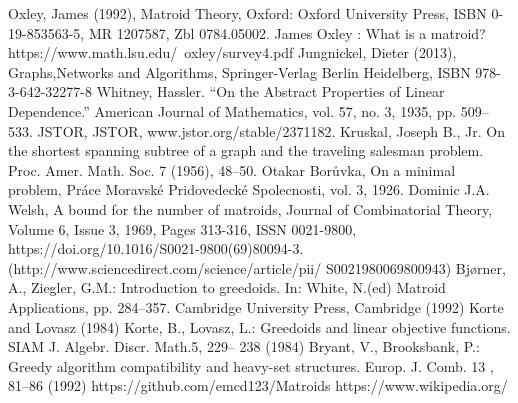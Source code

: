 \documentclass{article}
\theoremstyle{plain}
\theoremstyle{definition}
\theoremstyle{remark}
\begin{document}
\begin{thebibliography}{}
    Oxley, James (1992), Matroid Theory, Oxford: Oxford University Press, ISBN 0-19-853563-5, MR 1207587, Zbl 0784.05002.
    James Oxley : What is a matroid? https://www.math.lsu.edu/~oxley/survey4.pdf
	Jungnickel, Dieter (2013), Graphs,Networks and Algorithms, Springer-Verlag Berlin Heidelberg, ISBN 978-3-642-32277-8 
	Whitney, Hassler. “On the Abstract Properties of Linear Dependence.” American Journal of Mathematics, vol. 57, no. 3, 1935, pp. 		509–533. JSTOR, JSTOR, www.jstor.org/stable/2371182.
	Kruskal, Joseph B., Jr. On the shortest spanning subtree of a graph and the traveling salesman problem. Proc. Amer. Math. Soc. 7 	(1956), 48–50. 
	Otakar Borůvka, On a minimal problem, Práce Moravské Pridovedecké Spolecnosti, vol. 3, 1926. 
	Dominic J.A. Welsh, A bound for the number of matroids, Journal of Combinatorial Theory, Volume 6, Issue 3, 1969, Pages 313-316, 	ISSN 0021-9800, https://doi.org/10.1016/S0021-9800(69)80094-3. (http://www.sciencedirect.com/science/article/pii/				S0021980069800943)
	Bjørner, A., Ziegler, G.M.: Introduction to greedoids. In: White, N.(ed) Matroid Applications, pp. 284–357. Cambridge University 	Press, Cambridge (1992)
	Korte and Lovasz (1984) Korte, B., Lovasz, L.: Greedoids and linear objective functions. SIAM J. Algebr. Discr. Math.5, 229– 			238 (1984)
	Bryant,  V.,  Brooksbank,  P.:  Greedy  algorithm  compatibility  and heavy-set structures. Europ. J. Comb. 13 , 81–86 (1992)
	https://github.com/emcd123/Matroids
	https://www.wikipedia.org/
\end{thebibliography}
\end{document}
